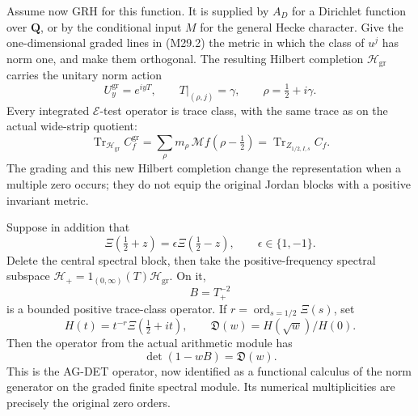 Assume now GRH for this function. It is supplied by \(A_D\)
for a Dirichlet function over \(\mathbf Q\), or by the
conditional input \(M\) for the general Hecke character.
Give the one-dimensional graded lines in (M29.2) the metric
in which the class of \(u^j\) has norm one, and make them
orthogonal. The resulting Hilbert completion
\(\mathcal H_{\mathrm{gr}}\) carries the unitary norm action
\[
        U_y^{\mathrm{gr}}=e^{iyT},\qquad
        T|_{(\rho,j)}=\gamma,\qquad \rho=\tfrac12+i\gamma.
                                                               \tag{M29.3}
\]
Every integrated \(\mathcal E\)-test operator is trace class,
with the same trace as on the actual wide-strip quotient:
\[
 \operatorname{Tr}_{\mathcal H_{\mathrm{gr}}}C_f^{\mathrm{gr}}
       =\sum_\rho m_\rho\,\mathcal Mf(\rho-\tfrac12)
       =\operatorname{Tr}_{Z_{1/2,I,s}} C_f .                  \tag{M29.4}
\]
The grading and this new Hilbert completion change the
representation when a multiple zero occurs; they do not
equip the original Jordan blocks with a positive invariant
metric.

Suppose in addition that
\[
 \Xi(\tfrac12+z)=\epsilon\Xi(\tfrac12-z),\qquad
       \epsilon\in\{1,-1\}.
                                                               \tag{M29.5}
\]
Delete the central spectral block, then take the
positive-frequency spectral subspace
\(\mathcal H_+=1_{(0,\infty)}(T)\mathcal H_{\mathrm{gr}}\).
On it,
\[
                          B=T_+^{-2}                         \tag{M29.6}
\]
is a bounded positive trace-class operator. If
\(r=\operatorname{ord}_{s=1/2}\Xi(s)\), set
\[
 H(t)=t^{-r}\Xi(\tfrac12+it),\qquad
              \mathfrak D(w)=H(\sqrt w)/H(0).
 \]
Then the operator from the actual arithmetic module has
\[
                       \det(1-wB)=\mathfrak D(w).             \tag{M29.7}
\]
This is the AG-DET operator, now identified as a functional
calculus of the norm generator on the graded finite
spectral module. Its numerical multiplicities are precisely
the original zero orders.

